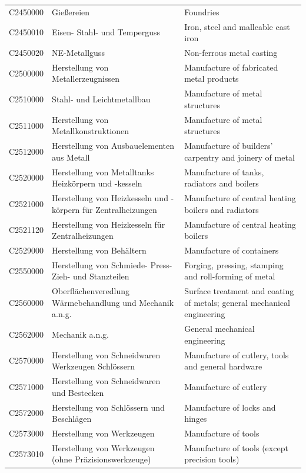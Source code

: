 \begin{longtable}{|p{3cm}|p{6cm}|p{6cm}|}
 C2450000   & Gießereien   & Foundries    \\
 C2450010   & Eisen- Stahl- und Temperguss   & Iron, steel and malleable cast iron    \\
 C2450020   & NE-Metallguss   & Non-ferrous metal casting    \\
 C2500000   & Herstellung von Metallerzeugnissen   & Manufacture of fabricated metal products    \\
 C2510000   & Stahl- und Leichtmetallbau   & Manufacture of metal structures    \\
 C2511000   & Herstellung von Metallkonstruktionen   & Manufacture of metal structures    \\
 C2512000   & Herstellung von Ausbauelementen aus Metall   & Manufacture of builders' carpentry and joinery of metal    \\
 C2520000   & Herstellung von Metalltanks Heizkörpern und -kesseln   & Manufacture of tanks, radiators and boilers    \\
 C2521000   & Herstellung von Heizkesseln und -körpern für Zentralheizungen   & Manufacture of central heating boilers and radiators    \\
 C2521120   & Herstellung von Heizkesseln für Zentralheizungen   & Manufacture of central heating boilers    \\
 C2529000   & Herstellung von Behältern   & Manufacture of containers    \\
 C2550000   & Herstellung von Schmiede- Press- Zieh- und Stanzteilen   & Forging, pressing, stamping and roll-forming of metal    \\
 C2560000   & Oberflächenveredlung Wärmebehandlung und Mechanik a.n.g.   & Surface treatment and coating of metals; general mechanical engineering    \\
 C2562000   & Mechanik a.n.g.   & General mechanical engineering    \\
 C2570000   & Herstellung von Schneidwaren Werkzeugen Schlössern   & Manufacture of cutlery, tools and general hardware    \\
 C2571000   & Herstellung von Schneidwaren und Bestecken   & Manufacture of cutlery    \\
 C2572000   & Herstellung von Schlössern und Beschlägen   & Manufacture of locks and hinges    \\
 C2573000   & Herstellung von Werkzeugen   & Manufacture of tools    \\
 C2573010   & Herstellung von Werkzeugen (ohne Präzisionswerkzeuge)   & Manufacture of tools (except precision tools)    \\

\end{longtable}
